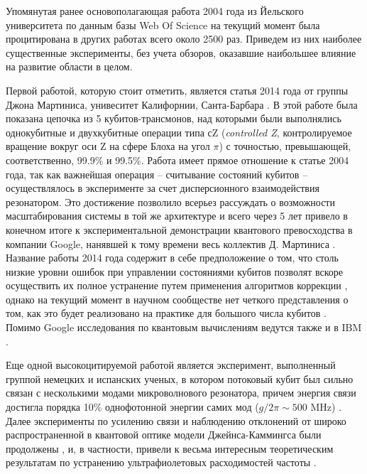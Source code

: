 \documentclass[14pt, a4paper]{extreport}
\numberwithin{equation}{section}
\begin{document}
Упомянутая ранее основополагающая работа 2004 года из Йельского университета \cite{wallraff2004strong} по данным базы Web Of Science на текущий момент была процитирована в других работах всего около 2500 раз. Приведем из них наиболее существенные эксперименты, без учета обзоров, оказавшие наибольшее влияние на развитие области в целом. 

Первой работой, которую стоит отметить, является статья 2014 года от группы Джона Мартиниса, унивеситет Калифорнии, Санта-Барбара \cite{barends2014superconducting}. В этой работе была показана цепочка из 5 кубитов-трансмонов, над которыми были выполнялись однокубитные и двухкубитные операции типа сZ (\textit{controlled Z}, контролируемое вращение вокруг оси Z на сфере Блоха на угол $\pi$) с точностью, превышающей, соответственно, 99.9\% и 99.5\%. Работа имеет прямое отношение к статье 2004 года, так как важнейшая операция -- считывание состояний кубитов -- осуществлялось в эксперименте за счет дисперсионного взаимодействия резонатором. Это достижение позволило всерьез рассуждать о возможности масштабирования системы в той же архитектуре и всего через 5 лет привело в конечном итоге к экспериментальной демонстрации квантового превосходства в компании Google, нанявшей к тому времени весь коллектив Д. Мартиниса \cite{arute2019quantum}. Название работы 2014 года содержит в себе предположение о том, что столь низкие уровни ошибок при управлении состояниями кубитов позволят вскоре осуществить их полное устранение путем применения алгоритмов коррекции \cite{shor1995scheme, fowler2012surface}, однако на текущий момент в научном сообществе нет четкого представления о том, как это будет реализовано на практике для большого числа кубитов \cite{kjaergaard2020superconducting}. Помимо Google исследования по квантовым вычислениям ведутся также и в IBM \cite{corcoles2015demonstration}.

Еще одной высокоцитируемой работой является эксперимент, выполненный группой немецких и испанских ученых, в котором потоковый кубит был сильно связан с несколькими модами микроволнового резонатора, причем энергия связи достигла порядка 10\% однофотонной энергии самих мод ($g/2\pi \sim 500$ MHz) \cite{niemczyk2010circuit}. Далее эксперименты по усилению связи и наблюдению отклонений от широко распространенной в квантовой оптике модели Джейнса-Каммингса были продолжены \cite{bosman2017multi}, и, в частности, привели к весьма интересным теоретическим результатам по устранению ультрафиолетовых расходимостей частоты \cite{gely2017convergence, malekakhlagh2017cutoff, parra2018quantum}.
\end{document}
